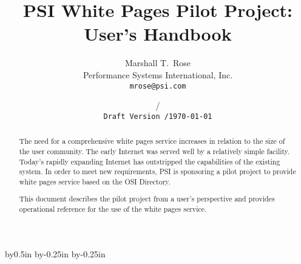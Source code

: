 


\def\theguide/{{\em The Guide\/}}
\def\thebook/{{\em The Handbook\/}}
\def\volfive/{{\em Volume Five\/}}
\def\camayoc/{{\em Camayoc\/}}


\makeatletter
\let\titlep@ge=\titlepage
\def\titlepage{\titlep@ge \def\thefootnote{\fnsymbol{footnote}}}

\let\endtitlep@ge=\endtitlepage
\let\endtitlepage=\relax

\let\m@ketitle=\maketitle
\def\maketitle{\m@ketitle\let\titlepage=\relax\let\endtitlepage=\endtitlep@ge}
\makeatother

\advance\textwidth by0.5in
\advance\oddsidemargin by-0.25in
\advance\evensidemargin by-0.25in

\newdimen\foosidemargin
\let\foosidemargin=\oddsidemargin
\let\oddsidemargin=\evensidemargin
\let\evensidemargin=\foosidemargin




\title{PSI White Pages Pilot Project:\\ User's Handbook}
\author{Marshall T.~Rose\\ Performance Systems International, Inc.\\
	\tt mrose@psi.com}
\date{\ifdraft \versiondate/\\ \tt Draft Version \versiontag/\else \today\fi}
\maketitle

\begin{abstract}
The need for a comprehensive white pages service increases in relation to the
size of the user community.
The early Internet was served well by a relatively simple facility.
Today's rapidly expanding Internet has outstripped the capabilities of the
existing system.
In order to meet new requirements,
PSI is sponsoring a pilot project to provide white pages
service based on the OSI Directory.

This document describes the pilot project from a user's perspective
and provides operational reference for the use of the white pages service.

\end{abstract}

